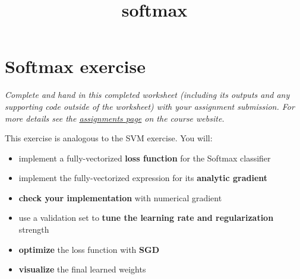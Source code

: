 \documentclass[11pt]{article}
\title{softmax}
\providecommand{\tightlist}{%
      \setlength{\itemsep}{0pt}\setlength{\parskip}{0pt}}
\begin{document}
    
    
    \maketitle
    
    

    
    \section{Softmax exercise}\label{softmax-exercise}

\emph{Complete and hand in this completed worksheet (including its
outputs and any supporting code outside of the worksheet) with your
assignment submission. For more details see the
\href{http://vision.stanford.edu/teaching/cs231n/assignments.html}{assignments
page} on the course website.}

This exercise is analogous to the SVM exercise. You will:

\begin{itemize}
\tightlist
\item
  implement a fully-vectorized \textbf{loss function} for the Softmax
  classifier
\item
  implement the fully-vectorized expression for its \textbf{analytic
  gradient}
\item
  \textbf{check your implementation} with numerical gradient
\item
  use a validation set to \textbf{tune the learning rate and
  regularization} strength
\item
  \textbf{optimize} the loss function with \textbf{SGD}
\item
  \textbf{visualize} the final learned weights
\end{itemize}
\end{document}
